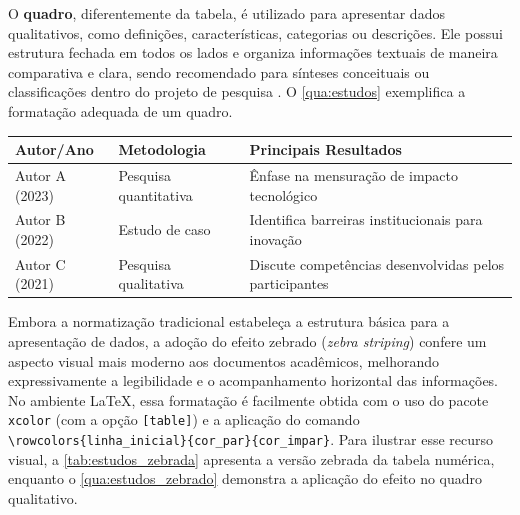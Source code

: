 



O \textbf{quadro}, diferentemente da tabela, é utilizado para apresentar dados qualitativos, como definições, características, categorias ou descrições. Ele possui estrutura fechada em todos os lados e organiza informações textuais de maneira comparativa e clara, sendo recomendado para sínteses conceituais ou classificações dentro do projeto de pesquisa \cite{ABNT_NBR14724_2011,ABNT_NBR15287_2011,ABNT_NBR6024_2012}. O \autoref{qua:estudos} exemplifica a formatação adequada de um quadro.


\begin{quadro}[htbp]  %
    \centering
    \caption{Exemplo de quadro, com conteudo qualitativo}
    \label{qua:estudos}
    \begin{tabularx}{\textwidth}{|p{3cm}|p{4cm}|X|} %
        \hline
        \textbf{Autor/Ano} & \textbf{Metodologia} & \textbf{Principais Resultados} \\
        \hline
        Autor A (2023) & Pesquisa quantitativa & Ênfase na mensuração de impacto tecnológico \\ \hline
        Autor B (2022) & Estudo de caso & Identifica barreiras institucionais para inovação \\ \hline
        Autor C (2021) & Pesquisa qualitativa & Discute competências desenvolvidas pelos participantes \\ \hline
    \end{tabularx}
\end{quadro}

Embora a normatização tradicional estabeleça a estrutura básica para a apresentação de dados, a adoção do efeito zebrado (\textit{zebra striping}) confere um aspecto visual mais moderno aos documentos acadêmicos, melhorando expressivamente a legibilidade e o acompanhamento horizontal das informações. No ambiente LaTeX, essa formatação é facilmente obtida com o uso do pacote \texttt{xcolor} (com a opção \texttt{[table]}) e a aplicação do comando \verb|\rowcolors{linha_inicial}{cor_par}{cor_impar}|. Para ilustrar esse recurso visual, a \autoref{tab:estudos_zebrada} apresenta a versão zebrada da tabela numérica, enquanto o \autoref{qua:estudos_zebrado} demonstra a aplicação do efeito no quadro qualitativo.

